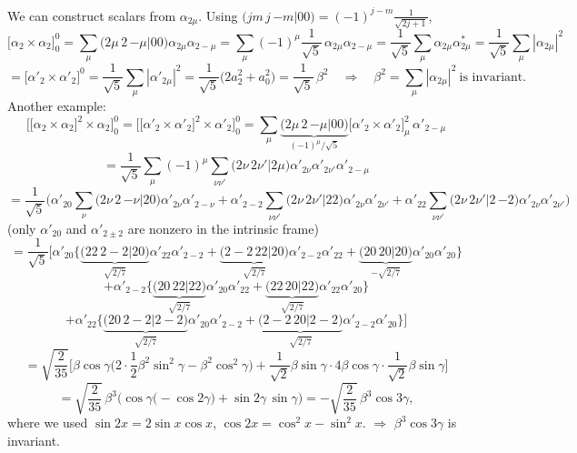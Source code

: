 \documentclass[11pt,a4paper]{article}
\begin{document}
We can construct scalars from $\alpha_{2\mu}$. Using $\big(jm\,j\,{-m}\big|00\big)=(-1)^{j-m}\frac{1}{\sqrt{2j+1}}$,
\[
\big[\alpha_2\times\alpha_2\big]^0_0=\sum_\mu\big(2\mu\,2\,{-\mu}\big|00\big)\alpha_{2\mu}\alpha_{2-\mu}
=\sum_\mu(-1)^{\mu}\frac{1}{\sqrt5}\,\alpha_{2\mu}\alpha_{2-\mu}
=\frac{1}{\sqrt5}\sum_\mu\alpha_{2\mu}\alpha^*_{2\mu}=\frac{1}{\sqrt5}\sum_\mu|\alpha_{2\mu}|^2
\]
\[
=\big[\alpha'_2\times\alpha'_2\big]^0=\frac{1}{\sqrt5}\sum_\mu|\alpha'_{2\mu}|^2=\frac{1}{\sqrt5}\big(2a_2^2+a_0^2\big)=\frac{1}{\sqrt5}\,\beta^2
\quad\Rightarrow\quad \beta^2=\sum_\mu|\alpha_{2\mu}|^2\ \text{is invariant}.
\]
Another example:
\[
\Big[\big[\alpha_2\times\alpha_2\big]^2\times\alpha_2\Big]^0_0=\Big[\big[\alpha'_2\times\alpha'_2\big]^2\times\alpha'_2\Big]^0_0
=\sum_\mu\underbrace{\big(2\mu\,2\,{-\mu}\big|00\big)}_{(-1)^\mu/\sqrt5}\big[\alpha'_2\times\alpha'_2\big]^2_\mu\,\alpha'_{2-\mu}
\]
\[
=\frac{1}{\sqrt5}\sum_\mu(-1)^\mu\sum_{\nu\nu'}\big(2\nu\,2\nu'\big|2\mu\big)\alpha'_{2\nu}\alpha'_{2\nu'}\alpha'_{2-\mu}
\]
\[
=\frac{1}{\sqrt5}\Big(\alpha'_{20}\sum_\nu\big(2\nu\,2\,{-\nu}\big|20\big)\alpha'_{2\nu}\alpha'_{2-\nu}
+\alpha'_{2-2}\sum_{\nu\nu'}\big(2\nu\,2\nu'\big|22\big)\alpha'_{2\nu}\alpha'_{2\nu'}
+\alpha'_{22}\sum_{\nu\nu'}\big(2\nu\,2\nu'\big|2\,{-2}\big)\alpha'_{2\nu}\alpha'_{2\nu'}\Big)
\]
(only $\alpha'_{20}$ and $\alpha'_{2\pm2}$ are nonzero in the intrinsic frame)
\[
=\frac{1}{\sqrt5}\Big[\alpha'_{20}\Big\{\underbrace{\big(22\,2{-}2\big|20\big)}_{\sqrt{2/7}}\alpha'_{22}\alpha'_{2-2}+\underbrace{\big(2{-}2\,22\big|20\big)}_{\sqrt{2/7}}\alpha'_{2-2}\alpha'_{22}+\underbrace{\big(20\,20\big|20\big)}_{-\sqrt{2/7}}\alpha'_{20}\alpha'_{20}\Big\}
\]
\[
+\alpha'_{2-2}\Big\{\underbrace{\big(20\,22\big|22\big)}_{\sqrt{2/7}}\alpha'_{20}\alpha'_{22}+\underbrace{\big(22\,20\big|22\big)}_{\sqrt{2/7}}\alpha'_{22}\alpha'_{20}\Big\}
\]
\[
+\alpha'_{22}\Big\{\underbrace{\big(20\,2{-}2\big|2{-}2\big)}_{\sqrt{2/7}}\alpha'_{20}\alpha'_{2-2}+\underbrace{\big(2{-}2\,20\big|2{-}2\big)}_{\sqrt{2/7}}\alpha'_{2-2}\alpha'_{20}\Big\}\Big]
\]
\[
=\sqrt{\frac{2}{35}}\Big[\beta\cos\gamma\Big(2\cdot\frac12\beta^2\sin^2\gamma-\beta^2\cos^2\gamma\Big)
+\frac{1}{\sqrt2}\beta\sin\gamma\cdot4\beta\cos\gamma\cdot\frac{1}{\sqrt2}\beta\sin\gamma\Big]
\]
\[
=\sqrt{\frac{2}{35}}\,\beta^3\Big(\cos\gamma\big(-\cos2\gamma\big)+\sin2\gamma\,\sin\gamma\Big)
=-\sqrt{\frac{2}{35}}\,\beta^3\cos3\gamma ,
\]
where we used $\sin2x=2\sin x\cos x$, $\cos2x=\cos^2x-\sin^2x$.
$\Rightarrow$ $\beta^3\cos3\gamma$ is invariant.
\end{document}
